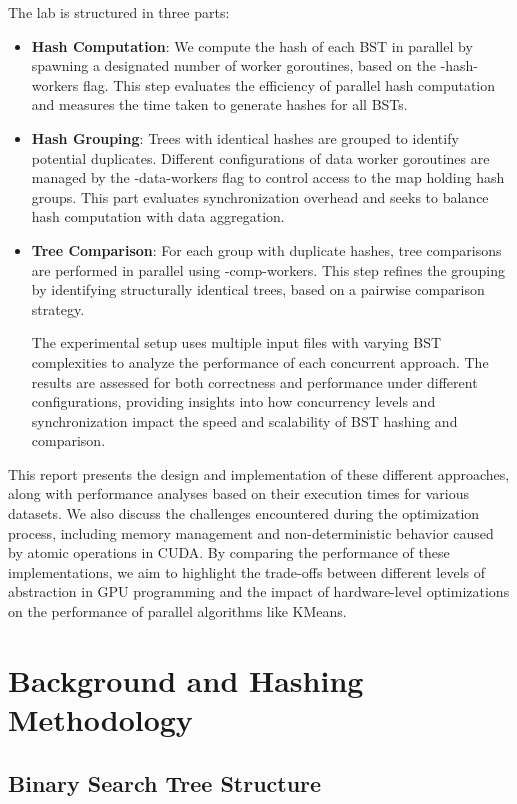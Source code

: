 \documentclass[letterpaper,12pt]{article}
\theoremstyle{remark}
\begin{document}
The lab is structured in three parts:
\begin{itemize}
 \item \textbf{Hash Computation}: We compute the hash of each BST in parallel by spawning a designated number of worker goroutines, based on the -hash-workers flag. This step evaluates the efficiency of parallel hash computation and measures the time taken to generate hashes for all BSTs.

 \item \textbf{Hash Grouping}: Trees with identical hashes are grouped to identify potential duplicates. Different configurations of data worker goroutines are managed by the -data-workers flag to control access to the map holding hash groups. This part evaluates synchronization overhead and seeks to balance hash computation with data aggregation.

 \item \textbf{Tree Comparison}: For each group with duplicate hashes, tree comparisons are performed in parallel using -comp-workers. This step refines the grouping by identifying structurally identical trees, based on a pairwise comparison strategy.

The experimental setup uses multiple input files with varying BST complexities to analyze the performance of each concurrent approach. The results are assessed for both correctness and performance under different configurations, providing insights into how concurrency levels and synchronization impact the speed and scalability of BST hashing and comparison.
\end{itemize}

This report presents the design and implementation of these different approaches, along with performance analyses based on their execution times for various datasets. We also discuss the challenges encountered during the optimization process, including memory management and non-deterministic behavior caused by atomic operations in CUDA. By comparing the performance of these implementations, we aim to highlight the trade-offs between different levels of abstraction in GPU programming and the impact of hardware-level optimizations on the performance of parallel algorithms like KMeans.



\section{Background and Hashing Methodology}
\subsection{Binary Search Tree Structure}
\end{document}
